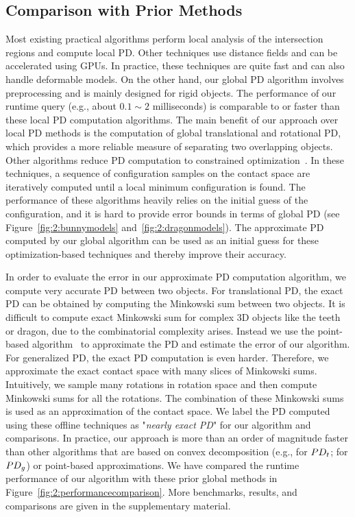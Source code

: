 \subsection{Comparison with Prior Methods}
Most existing practical algorithms perform local analysis of the intersection regions and
compute local PD. Other techniques use distance fields and can be accelerated using GPUs. In practice, these techniques are quite fast and can also handle
deformable models. On the other hand, our global PD algorithm involves preprocessing and is mainly designed for rigid objects.
The performance of our runtime query (e.g., about $0.1\sim2$ milliseconds) is comparable to or faster than these local PD computation algorithms. The main benefit of our approach over local PD methods is the computation of global
translational and rotational PD, which provides a more reliable measure of separating two overlapping objects.
Other algorithms reduce PD computation to constrained optimization~\cite{Nawratil:2009:GPD,Zhang:2007:AFP,Je:2012:PRP}.
In these techniques, a sequence of configuration samples on the contact space are iteratively
computed until a local minimum configuration is found. The
performance of these algorithms heavily relies on the initial guess of the configuration, and it is hard to provide
error bounds in terms of global PD (see Figure~\ref{fig:2:bunnymodels} and~\ref{fig:2:dragonmodels}). The approximate PD computed by our global algorithm can be used as an initial guess for these optimization-based techniques and thereby improve their accuracy.


In order to evaluate the error in our approximate PD computation algorithm, we compute very accurate PD between two objects. For translational PD, the exact PD can be obtained by computing the Minkowski sum between two objects. 
It is difficult to compute exact Minkowski sum for complex 3D objects like the teeth or dragon, due to the combinatorial complexity arises. Instead we use the point-based algorithm~\cite{Lien:2009:ASM} to approximate the PD and estimate the error of our algorithm.
For generalized PD, the exact PD computation is even harder. Therefore, we approximate the exact contact space with many slices of Minkowski sums. Intuitively, we sample many rotations in rotation space and then compute Minkowski sums for all the rotations. The combination of these Minkowski sums is used as an approximation of the contact space. We label the PD computed using these offline techniques as "\emph{nearly exact PD}" for our algorithm and comparisons.
In practice, our approach is more than an order of magnitude faster than other algorithms that are based on convex decomposition (e.g., \cite{Kim:2002:FPD} for $PD_t$; \cite{Zhang:2007:GPD} for $PD_g$) or point-based approximations. We have compared the runtime performance of our algorithm with these prior global methods in Figure~\ref{fig:2:performancecomparison}. More benchmarks, results, and comparisons are given in the supplementary material.


